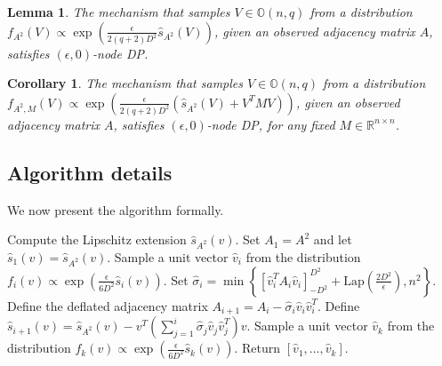 \documentclass{article}
\newtheorem{corollary}{Corollary}
\newtheorem{lemma}{Lemma}
\newcommand{\sigmahat}{\ensuremath{\widehat{\sigma}}}
\begin{document}
\begin{lemma}
\label{LemExpPCA}
The mechanism that samples $V \in \mathbb{O}(n,q)$ from a distribution $f_{A^2}(V) \propto \exp\left(\frac{\epsilon}{2(q+2)D^2} \widehat{s}_{A^2}(V)\right)$, given an observed adjacency matrix $A$, satisfies $(\epsilon, 0)$-node DP. 
\end{lemma}

\begin{corollary}
\label{cor:ExpPCA_Cor}
The mechanism that samples $V \in \mathbb{O}(n,q)$ from a distribution $f_{A^2, M}(V) \propto \exp\left(\frac{\epsilon}{2(q+2)D^2} (\widehat{s}_{A^2}(V) + V^TMV)\right)$, given an observed adjacency matrix $A$, satisfies $(\epsilon, 0)$-node DP, for any fixed $M \in \mathbb{R}^{n \times n}$. 
\end{corollary}

\subsection{Algorithm details}

We now present the algorithm formally.

\begin{algorithm}[h!]
\caption{Private Eigenvector Deflation via Lipschitz Extensions}
\label{AlgEF}
\begin{algorithmic}[1]
\State Compute the Lipschitz extension $\widehat{s}_{A^2}(v)$.
\State Set $A_1 = A^2$ and let $\widehat{s}_{1}(v) = \widehat{s}_{A^2}(v)$.
    \State Sample a unit vector $\hat{v}_i$ from the distribution $f_i(v) \propto \exp\left(\frac{\epsilon}{6D^2} \widehat{s}_{i}(v)\right)$.
\Else
{}
\EndIf
        \State Set $\hat{\sigma}_i = \min\left\{\left[\hat{v}_i^T A_i \hat{v}_i\right]_{-D^2}^{D^2} + \mathrm{Lap}\left(\frac{2D^2}{\epsilon}\right), n^2\right\}$.
    \State Define the deflated adjacency matrix $A_{i+1} = A_i - \hat{\sigma}_i \hat{v}_i \hat{v}_i^T$.
    \State Define $\widehat{s}_{i+1}(v) = \widehat{s}_{A^2}(v) - v^T \left(\sum_{j=1}^i \sigmahat_j \hat{v}_j \hat{v}_j^T\right) v$.
    \EndFor
\State Sample a unit vector $\hat{v}_k$ from the distribution $f_k(v) \propto \exp\left(\frac{\epsilon}{6D^2} \widehat{s}_{k}(v)\right)$.
\State Return $[\hat{v}_1, \dots, \hat{v}_k]$.
\EndFunction
\end{algorithmic}
\end{algorithm}
\end{document}

